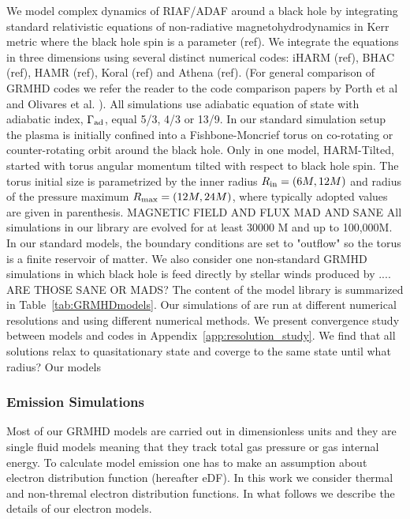We model complex dynamics of RIAF/ADAF around a black hole by integrating standard relativistic equations of  non-radiative magnetohydrodynamics in Kerr metric where the black hole spin is a parameter (ref). We integrate the equations in three dimensions using several distinct numerical codes: iHARM (ref), BHAC (ref), HAMR (ref), Koral (ref) and Athena (ref). (For general comparison of GRMHD codes we refer the reader to the code comparison papers by Porth et al and Olivares et al. ).
All simulations use adiabatic equation of state with adiabatic index, $\Gamma_{\rm ad}$, equal 5/3, 4/3 or 13/9.
In our standard simulation setup the plasma is initially confined into a Fishbone-Moncrief torus on co-rotating or counter-rotating orbit around the black hole. Only in one model, HARM-Tilted, started with torus angular momentum tilted with respect to black hole spin. The torus initial size is parametrized by the inner radius $R_{\rm in}=(6M,12M)$ and radius of the pressure maximum $R_{\rm max}=(12M,24M)$, where typically adopted values are given in parenthesis.  MAGNETIC FIELD AND FLUX MAD AND SANE
All simulations in our library are evolved for at least 30000 M and up to 100,000M. In our standard models, the boundary conditions are set to "outflow" so the torus is a finite reservoir of matter.
We also consider one non-standard GRMHD simulations in which \sgra black hole is feed directly by stellar winds produced by .... ARE THOSE SANE OR MADS?
The content of the model library is summarized in Table~\ref{tab:GRMHDmodels}. Our simulations of \sgra are run at different numerical resolutions and using different numerical methods. We present convergence study between models and codes in Appendix~\ref{app:resolution_study}. We find that all solutions relax to quasitationary state and coverge to the same state until what radius? Our models


\subsubsection{Emission Simulations}


Most of our GRMHD models are carried out in dimensionless units and
they are single fluid models meaning that they track total gas
pressure or gas internal energy. To calculate model emission one has
to make an assumption about electron distribution function (hereafter
eDF). In this work we consider thermal and non-thremal electron
distribution functions. In what follows we describe the details of our
electron models.


